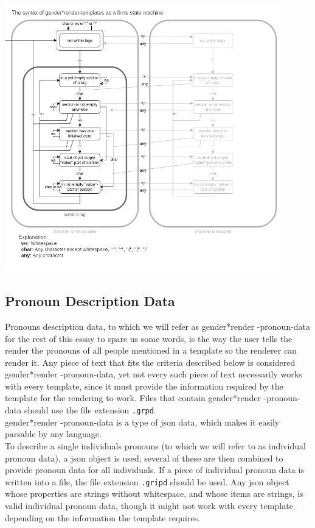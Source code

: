 \documentclass{article}
\newcommand{\GenderRender}{
    gender*render
}
\begin{document}
    \includegraphics[width=12cm]{images/template-as-finite-state-machine.png}

    \subsection{Pronoun Description Data}

     Pronouns description data, to which we will refer as \GenderRender-pronoun-data for the rest of this essay to spare us some words, is the way the user tells the render the pronouns of all people mentioned in a template so the renderer can render it.
     Any piece of text that fits the criteria described below is considered \GenderRender-pronoun-data, yet not every such piece of text necessarily works with every template, since it must provide the information required by the template for the rendering to work.
    Files that contain \GenderRender-pronoun-data should use the file extension \texttt{.grpd}.\\

    \GenderRender-pronoun-data is a type of json data, which makes it easily parsable by any language.\\

    To describe a single individuals pronouns (to which we will refer to as individual pronoun data), a json object is used;
    several of these are then combined to provide pronoun data for all individuals.
    If a piece of individual pronoun data is written into a file, the file extension \texttt{.gripd} should be used.
    Any json object whose properties are strings without whitespace, and whose items are strings, is valid individual pronoun data, though it might not work with every template depending on the information the template requires.\\
\end{document}
